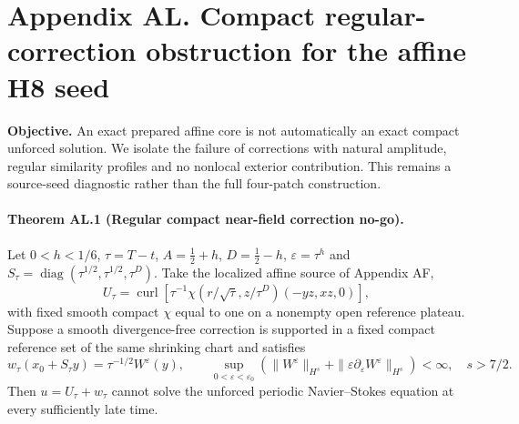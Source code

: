 \clearpage
\section*{Appendix AL. Compact regular-correction obstruction for the affine H8 seed}
\noindent\textbf{Objective.} An exact prepared affine core is not automatically an exact compact unforced solution. We isolate the failure of corrections with natural amplitude, regular similarity profiles and no nonlocal exterior contribution. This remains a source-seed diagnostic rather than the full four-patch construction.

\paragraph{Theorem AL.1 (Regular compact near-field correction no-go).}
Let $0<h<1/6$, $\tau=T-t$, $A=\frac12+h$, $D=\frac12-h$, $\varepsilon=\tau^h$ and
$S_\tau=\operatorname{diag}(\tau^{1/2},\tau^{1/2},\tau^D)$.
Take the localized affine source of Appendix AF,
\[
 U_\tau=\operatorname{curl}\left[
 \tau^{-1}\chi(r/\sqrt\tau,z/\tau^D)(-yz,xz,0)\right],
\]
with fixed smooth compact $\chi$ equal to one on a nonempty open reference plateau.
Suppose a smooth divergence-free correction is supported in a fixed compact reference set of the same shrinking chart and satisfies
\[
 w_\tau(x_0+S_\tau y)=\tau^{-1/2}W^\varepsilon(y),\qquad
 \sup_{0<\varepsilon<\varepsilon_0}
 \left(\|W^\varepsilon\|_{H^s}+
 \|\varepsilon\partial_\varepsilon W^\varepsilon\|_{H^s}\right)<\infty,
 \quad s>7/2.
\]
Then $u=U_\tau+w_\tau$ cannot solve the unforced periodic Navier--Stokes equation at every sufficiently late time.

